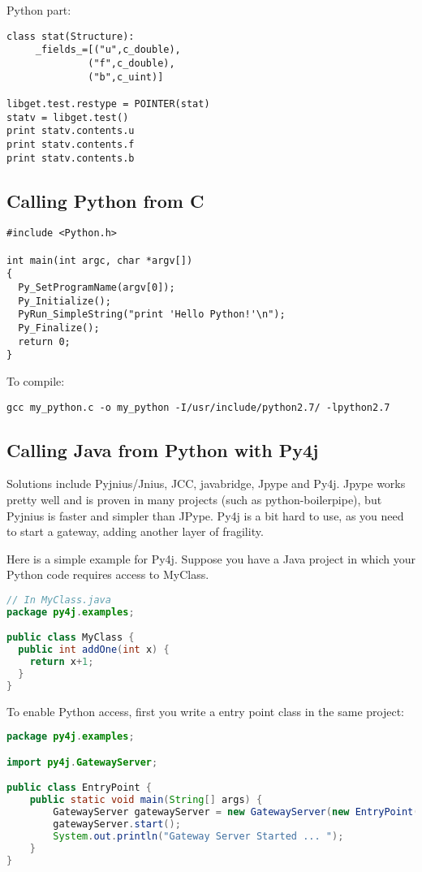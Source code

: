 Python part:
\begin{verbatim}
class stat(Structure):
     _fields_=[("u",c_double),
              ("f",c_double),
              ("b",c_uint)]

libget.test.restype = POINTER(stat)
statv = libget.test()
print statv.contents.u
print statv.contents.f
print statv.contents.b
\end{verbatim}


\subsection{Calling Python from C}
\begin{verbatim}
#include <Python.h>

int main(int argc, char *argv[])
{
  Py_SetProgramName(argv[0]);
  Py_Initialize();
  PyRun_SimpleString("print 'Hello Python!'\n");
  Py_Finalize();
  return 0;
}
\end{verbatim}

To compile:
\begin{verbatim}
gcc my_python.c -o my_python -I/usr/include/python2.7/ -lpython2.7
\end{verbatim}

\subsection{Calling Java from Python with Py4j}

Solutions include Pyjnius/Jnius, JCC, javabridge, Jpype and Py4j.
Jpype works pretty well and is proven in many projects (such as
python-boilerpipe), but Pyjnius is faster and simpler than JPype.
Py4j is a bit hard to use, as you need to start a gateway, adding another layer
of fragility.

Here is a simple example for Py4j. 
Suppose you have a Java project in which your Python code requires access to
MyClass.

\begin{lstlisting}[language=Java]
// In MyClass.java
package py4j.examples;

public class MyClass {
  public int addOne(int x) {
    return x+1;
  }
}

\end{lstlisting}

To enable Python access, first you write a entry point class in the same
project:

\begin{lstlisting}[language=Java]
package py4j.examples;

import py4j.GatewayServer;

public class EntryPoint {
    public static void main(String[] args) {
        GatewayServer gatewayServer = new GatewayServer(new EntryPoint());
        gatewayServer.start();
        System.out.println("Gateway Server Started ... ");
    }
}
\end{lstlisting}

